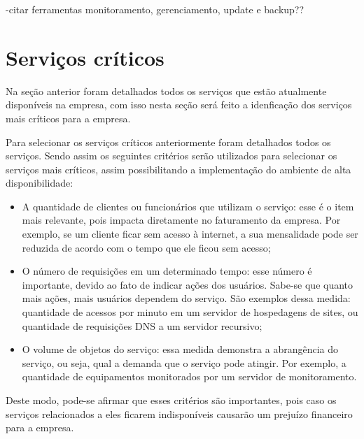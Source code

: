 -citar ferramentas monitoramento, gerenciamento, update e backup??

\section{Serviços críticos}
\label{section:servcrit}

Na seção anterior foram detalhados todos os serviços que estão atualmente disponíveis na empresa, com isso nesta seção será feito a 
idenficação dos serviços mais críticos para a empresa.

Para selecionar os serviços críticos anteriormente foram detalhados todos os serviços. Sendo assim os seguintes critérios serão utilizados para
selecionar os serviços mais críticos, assim possibilitando a implementação do ambiente de alta disponibilidade: 
\begin{itemize}
 \item A quantidade de clientes ou funcionários que utilizam o serviço: esse é o item mais relevante, pois impacta diretamente no faturamento
 da empresa. Por exemplo, se um cliente ficar sem acesso à internet, a sua mensalidade pode ser reduzida de acordo com o tempo que ele ficou
 sem acesso; 
 \item O número de requisições em um determinado tempo: esse número é importante, devido ao fato de indicar ações dos usuários. Sabe-se que
 quanto mais ações, mais usuários dependem do serviço. São exemplos dessa medida: quantidade de acessos por minuto em um servidor de hospedagens 
 de sites, ou quantidade de requisições \ac{DNS} a um servidor recursivo;
 \item O volume de objetos do serviço: essa medida demonstra a abrangência do serviço, ou seja, qual a demanda que o serviço pode atingir.
 Por exemplo, a quantidade de equipamentos monitorados por um servidor de monitoramento.
\end{itemize}

Deste modo, pode-se afirmar que esses critérios são importantes, pois caso os serviços relacionados a eles ficarem indisponíveis causarão 
um prejuízo financeiro para a empresa. 

